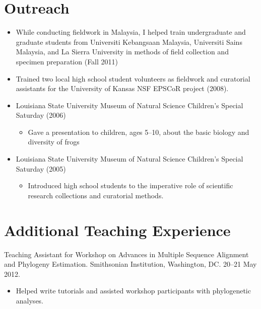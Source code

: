 \documentclass[10pt]{article}
\newenvironment{myItemize}{
  \begin{itemize}
    \setlength{\leftskip}{-4mm}
    \setlength{\itemsep}{0.25em}
    \setlength{\parskip}{0pt}
    \setlength{\parsep}{0.5em}}
  {\end{itemize}}
\newcommand{\myHangIndent}{\hangindent=5mm}
\newcommand{\myIndent}{\hspace{5mm}}
\begin{document}
\section*{Outreach}
\begin{myItemize}
\item While conducting fieldwork in Malaysia, I helped train undergraduate and
    graduate students from Universiti Kebangsaan Malaysia, Universiti Sains
    Malaysia, and La Sierra University in methods of field collection and
    specimen preparation (Fall 2011)
\item Trained two local high school student volunteers as fieldwork and
    curatorial assistants for the University of Kansas NSF EPSCoR project
    (2008).
\item Louisiana State University Museum of Natural Science Children's Special
    Saturday (2006)
    \begin{myItemize}
        \item Gave a presentation to children, ages 5--10, about the basic
            biology and diversity of frogs
    \end{myItemize}
\item Louisiana State University Museum of Natural Science Children's Special
    Saturday (2005)
    \begin{myItemize}
        \item Introduced high school students to the imperative role of
            scientific research collections and curatorial methods.
    \end{myItemize}
\end{myItemize}

\section*{Additional Teaching Experience}
\myHangIndent
Teaching Assistant for Workshop on Advances in Multiple Sequence Alignment and
Phylogeny Estimation.  Smithsonian Institution, Washington, DC.
20--21 May 2012. \\
\begin{itemize}
    \setlength{\leftskip}{0em}
    \setlength{\itemsep}{0.25em}
    \setlength{\parskip}{-1em}
    \setlength{\parsep}{0.5em}
    \item Helped write tutorials and assisted workshop participants with
        phylogenetic analyses.
\end{itemize}
\end{document}
